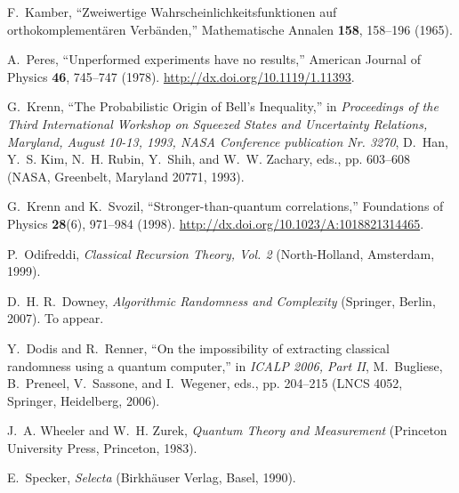 \documentclass[pra,amsfonts,preprint,showkeys]{revtex4}
\begin{document}
\begin{thebibliography}{10}
F.~Kamber, \enquote{Zweiwertige {W}ahrscheinlichkeitsfunktionen auf
  orthokomplement{\"{a}}ren {V}erb{\"{a}}nden,} Mathematische Annalen
  \textbf{158}, 158--196 (1965).

A.~Peres, \enquote{Unperformed experiments have no results,} American Journal
  of Physics \textbf{46}, 745--747 (1978).
  \urlprefix\url{http://dx.doi.org/10.1119/1.11393}.

G.~Krenn, \enquote{The Probabilistic Origin of {B}ell's Inequality,} in
  \emph{Proceedings of the Third International Workshop on Squeezed States and
  Uncertainty Relations, Maryland, August 10-13, 1993, NASA Conference
  publication Nr. 3270}, D.~Han, Y.~S. Kim, N.~H. Rubin, Y.~Shih, and W.~W.
  Zachary, eds., pp. 603--608 (NASA, Greenbelt, Maryland 20771, 1993).

G.~Krenn and K.~Svozil, \enquote{Stronger-than-quantum correlations,}
  Foundations of Physics \textbf{28}(6), 971--984 (1998).
  \urlprefix\url{http://dx.doi.org/10.1023/A:1018821314465}.

P.~Odifreddi, \emph{Classical Recursion Theory, Vol. 2} (North-Holland,
  Amsterdam, 1999).

D.~H. R.~Downey, \emph{Algorithmic Randomness and Complexity} (Springer,
  Berlin, 2007). To appear.

Y.~Dodis and R.~Renner, \enquote{On the impossibility of extracting classical
  randomness using a quantum computer,} in \emph{ICALP 2006, Part II},
  M.~Bugliese, B.~Preneel, V.~Sassone, and I.~Wegener, eds., pp. 204--215 (LNCS
  4052, Springer, Heidelberg, 2006).

J.~A. Wheeler and W.~H. Zurek, \emph{Quantum Theory and Measurement} (Princeton
  University Press, Princeton, 1983).

E.~Specker, \emph{Selecta} (Birkh{\"{a}}user Verlag, Basel, 1990).

\end{thebibliography}
\end{document}
